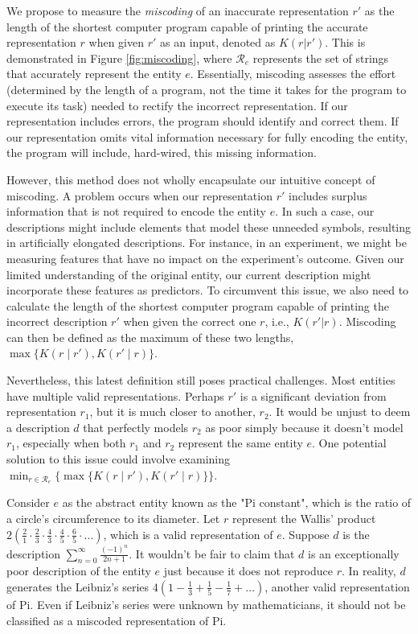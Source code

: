 We propose to measure the \emph{miscoding} of an inaccurate representation $r'$ as the length of the shortest computer program capable of printing the accurate representation $r$ when given $r'$ as an input, denoted as $K(r|r')$. This is demonstrated in Figure \ref{fig:miscoding}, where $\mathcal{R}_e$ represents the set of strings that accurately represent the entity $e$. Essentially, miscoding assesses the effort (determined by the length of a program, not the time it takes for the program to execute its task) needed to rectify the incorrect representation. If our representation includes errors, the program should identify and correct them. If our representation omits vital information necessary for fully encoding the entity, the program will include, hard-wired, this missing information.

However, this method does not wholly encapsulate our intuitive concept of miscoding. A problem occurs when our representation $r'$ includes surplus information that is not required to encode the entity $e$. In such a case, our descriptions might include elements that model these unneeded symbols, resulting in artificially elongated descriptions. For instance, in an experiment, we might be measuring features that have no impact on the experiment's outcome. Given our limited understanding of the original entity, our current description might incorporate these features as predictors. To circumvent this issue, we also need to calculate the length of the shortest computer program capable of printing the incorrect description $r'$ when given the correct one $r$, i.e., $K(r'|r)$. Miscoding can then be defined as the maximum of these two lengths, $\max\{ K(r \mid r'), K(r' \mid r)\}$.

Nevertheless, this latest definition still poses practical challenges. Most entities have multiple valid representations. Perhaps $r'$ is a significant deviation from representation $r_1$, but it is much closer to another, $r_2$. It would be unjust to deem a description $d$ that perfectly models $r_2$ as poor simply because it doesn't model $r_1$, especially when both $r_1$ and $r_2$ represent the same entity $e$. One potential solution to this issue could involve examining $\min_{r \in \mathcal{R}_e} \{ \max\{ K(r \mid r'), K(r' \mid r)\} \}$.

\begin{example}
\label{ex:leibnez-wallis}
Consider $e$ as the abstract entity known as the "Pi constant", which is the ratio of a circle's circumference to its diameter. Let $r$ represent the Wallis' product $2 (\frac{2}{1} \cdot \frac{2}{3} \cdot \frac{4}{3} \cdot \frac{4}{5} \cdot \frac{6}{5} \cdot \ldots)$, which is a valid representation of $e$. Suppose $d$ is the description $\sum_{n=0}^\infty \frac{(-1)^n}{2n+1}$. It wouldn't be fair to claim that $d$ is an exceptionally poor description of the entity $e$ just because it does not reproduce $r$. In reality, $d$ generates the Leibniz's series $4 (1 - \frac{1}{3} + \frac{1}{5} - \frac{1}{7} + \ldots)$, another valid representation of Pi. Even if Leibniz's series were unknown by mathematicians, it should not be classified as a miscoded representation of Pi.
\end{example}

